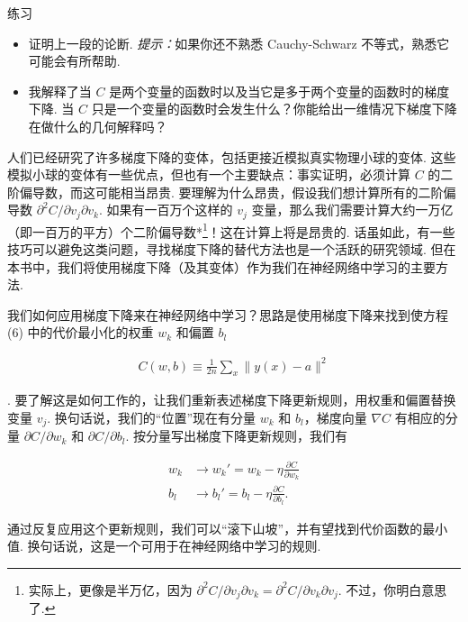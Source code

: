 \begin{exerciseBox}{练习}

\begin{itemize}

\item 证明上一段的论断. \emph{提示：}如果你还不熟悉 Cauchy-Schwarz 不等式，熟悉它可能会有所帮助.

\item 我解释了当 $C$ 是两个变量的函数时以及当它是多于两个变量的函数时的梯度下降. 当 $C$ 只是一个变量的函数时会发生什么？你能给出一维情况下梯度下降在做什么的几何解释吗？

\end{itemize}

人们已经研究了许多梯度下降的变体，包括更接近模拟真实物理小球的变体. 这些模拟小球的变体有一些优点，但也有一个主要缺点：事实证明，必须计算 $C$ 的二阶偏导数，而这可能相当昂贵. 要理解为什么昂贵，假设我们想计算所有的二阶偏导数 $\partial^2 C/ \partial v_j \partial v_k$. 如果有一百万个这样的 $v_j$ 变量，那么我们需要计算大约一万亿（即一百万的平方）个二阶偏导数*\footnote{实际上，更像是半万亿，因为 $\partial^2 C/ \partial v_j \partial v_k = \partial^2 C/ \partial v_k \partial v_j$. 不过，你明白意思了.}！这在计算上将是昂贵的. 话虽如此，有一些技巧可以避免这类问题，寻找梯度下降的替代方法也是一个活跃的研究领域. 但在本书中，我们将使用梯度下降（及其变体）作为我们在神经网络中学习的主要方法.

我们如何应用梯度下降来在神经网络中学习？思路是使用梯度下降来找到使方程 (6) 中的代价最小化的权重 $w_k$ 和偏置 $b_l$

\begin{align*}
C(w,b) \equiv \frac{1}{2n} \sum_x \| y(x) - a\|^2 \nonumber
\end{align*}

\noindent. 要了解这是如何工作的，让我们重新表述梯度下降更新规则，用权重和偏置替换变量 $v_j$. 换句话说，我们的``位置''现在有分量 $w_k$ 和 $b_l$，梯度向量 $\nabla C$ 有相应的分量 $\partial C / \partial w_k$ 和 $\partial C / \partial b_l$. 按分量写出梯度下降更新规则，我们有

\begin{align}
w_k &\rightarrow w_k' = w_k-\eta \frac{\partial C}{\partial w_k} \tag{16} \\ b_l &\rightarrow b_l' = b_l-\eta \frac{\partial C}{\partial b_l}. \tag{17}
\end{align}

\noindent 通过反复应用这个更新规则，我们可以``滚下山坡''，并有望找到代价函数的最小值. 换句话说，这是一个可用于在神经网络中学习的规则.


\end{exerciseBox}
